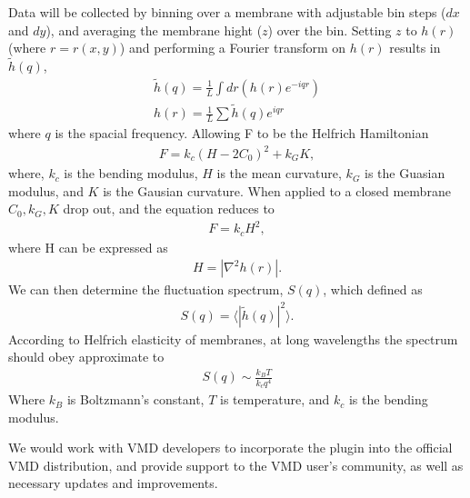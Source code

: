 Data will be collected by binning over a membrane with adjustable bin steps ($dx$ and $dy$), and averaging the membrane hight ($z$) over the bin. Setting $z$ to $h(r)$ (where $r=r(x,y)$) and performing a Fourier transform on $h(r)$ results in $\tilde{h}(q)$,
	\begin{equation}
		\begin{aligned}
		\tilde{h}(q)=\frac{1}{L}\int dr (h(r) e^{-i q r})\\
		h(r)=\frac{1}{L}\sum \tilde{h}(q) e^{i q r}
		\label{eq:For}
		\end{aligned}
	\end{equation}
where $q$ is the spacial frequency. Allowing F to be the Helfrich Hamiltonian
\begin{equation}
  \begin{aligned}
    F = k_c(H-2C_0)^2+k_GK,
  \end{aligned}
\end{equation}
where, $k_c$ is the bending modulus, $H$ is the mean curvature, $k_G$ is the Guasian modulus, and $K$ is the Gausian curvature. When applied to a closed membrane $C_0,k_G,K$ drop out, and the equation reduces to 
\begin{equation}
  \begin{aligned}
    F = k_cH^2,
  \end{aligned}
\end{equation}
where H can be expressed as
\begin{equation}
  \begin{aligned}
    H = |\nabla^2h(r)|.
  \end{aligned}
\end{equation}
We can then determine the fluctuation spectrum, $S(q)$, which \cite{Goetz1999} defined as
  \begin{equation}
    \begin{aligned}
      S(q)=\langle|\tilde{h}(q)|^{2}\rangle.
    \end{aligned}
    \label{eq:s1}
  \end{equation}
According to Helfrich elasticity of membranes,\cite{safran2003statistical} at long wavelengths the spectrum should obey approximate to 
  \begin{equation}
    \begin{aligned}
      S(q)\sim\frac{k_BT}{k_c q^4}%
    \end{aligned}
    \label{eq:s2}
  \end{equation}
Where $k_B$ is Boltzmann's constant, $T$ is temperature, and $k_c$ is the bending modulus.

We would work with VMD developers to incorporate the plugin into the official VMD distribution, and provide support to the VMD user’s community, as well as necessary updates and improvements.
